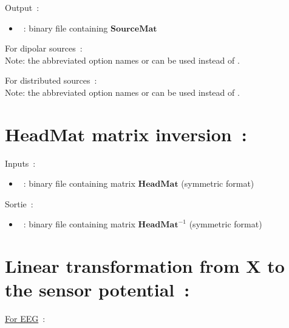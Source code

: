 \noindent
Output~:
\begin{itemize}
    \item {}~: binary file containing $\mathbf{SourceMat}$
\end{itemize}

\medskip

\noindent
For dipolar sources~:\\
\noindent
{}
\medskip
Note:  the abbreviated option names  or  can be used instead of .

\medskip

\noindent
For distributed sources~:\\
\noindent
{}
\medskip
Note: the abbreviated option names   or   can be used instead of  .

\section{ $\mathbf{HeadMat}$ matrix inversion~:}
\label{sect: command invert HeadMat}

\noindent
Inputs~:
\begin{itemize}
    \item {}~: binary file containing matrix $\mathbf{HeadMat}$ (symmetric format)
\end{itemize}

\noindent
Sortie~:
\begin{itemize}
    \item {}~: binary file containing matrix $\mathbf{HeadMat}^{-1}$ (symmetric format)
\end{itemize}

\medskip

\noindent
{}

\section{Linear transformation from X to the sensor potential~:}
\label{sect: command assemble sensors}

\checkItem \underline{For EEG}~:\\

